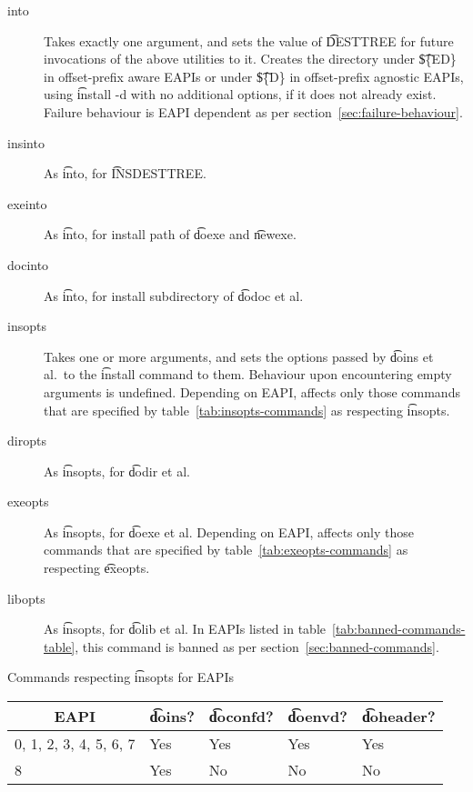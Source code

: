 \begin{description}

\item[into] Takes exactly one argument, and sets the value of \t{DESTTREE} for future invocations
    of the above utilities to it. Creates the directory under \t{\$\{ED\}} in offset-prefix aware
    EAPIs or under \t{\$\{D\}} in offset-prefix agnostic EAPIs, using \t{install -d} with no
    additional options, if it does not already exist. Failure behaviour is EAPI dependent as per
    section~\ref{sec:failure-behaviour}.

\item[insinto] As \t{into}, for \t{INSDESTTREE}.

\item[exeinto] As \t{into}, for install path of \t{doexe} and \t{newexe}.

\item[docinto] As \t{into}, for install subdirectory of \t{dodoc} et al.

\item[insopts]  Takes one or more arguments, and sets the options passed by
    \t{doins} et al.\ to the \t{install} command to them. Behaviour upon encountering empty
    arguments is undefined. Depending on EAPI, affects only those commands that are specified
    by table~\ref{tab:insopts-commands} as respecting \t{insopts}.

\item[diropts] As \t{insopts}, for \t{dodir} et al.

\item[exeopts]  As \t{insopts}, for \t{doexe} et al. Depending on EAPI,
    affects only those commands that are specified by table~\ref{tab:exeopts-commands}
    as respecting \t{exeopts}.

\item[libopts] As \t{insopts}, for \t{dolib} et al.
    In EAPIs listed in table~\ref{tab:banned-commands-table}, this command is banned as
    per section~\ref{sec:banned-commands}.

\end{description}

\begin{centertable}{Commands respecting \t{insopts} for EAPIs}
    \label{tab:insopts-commands}
    \begin{tabular}{lllll}
      \toprule
      \multicolumn{1}{c}{\textbf{EAPI}} &
      \multicolumn{1}{c}{\textbf{\t{doins}?}} &
      \multicolumn{1}{c}{\textbf{\t{doconfd}?}} &
      \multicolumn{1}{c}{\textbf{\t{doenvd}?}} &
      \multicolumn{1}{c}{\textbf{\t{doheader}?}} \\
      \midrule
      0, 1, 2, 3, 4, 5, 6, 7  & Yes & Yes & Yes & Yes \\
      8                       & Yes & No  & No  & No  \\
      \bottomrule
    \end{tabular}
\end{centertable}

